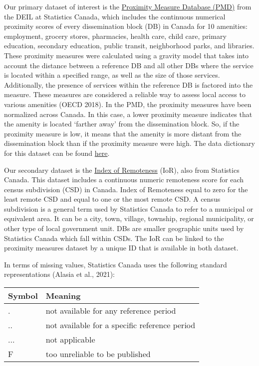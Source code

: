 \documentclass[11pt, a4paper]{article}
\begin{document}
Our primary dataset of interest is the \href{https://www150.statcan.gc.ca/n1/pub/17-26-0002/2020001/csv/pmd-eng.zip}{Proximity Measure Database (PMD)} from the DEIL at Statistics Canada, which includes the continuous numerical proximity scores of every dissemination block (DB) in Canada for 10 amenities: employment, grocery stores, pharmacies, health care, child care, primary education, secondary education, public transit, neighborhood parks, and libraries. These proximity measures were calculated using a gravity model that takes into account the distance between a reference DB and all other DBs where the service is located within a specified range, as well as the size of those services. Additionally, the presence of services within the reference DB is factored into the measure. These measures are considered a reliable way to assess local access to various amenities (OECD 2018). In the PMD, the proximity measures have been normalized across Canada. In this case, a lower proximity measure indicates that the amenity is located `farther away' from the dissemination block. So, if the proximity measure is low, it means that the amenity is more distant from the dissemination block than if the proximity measure were high. The data dictionary for this dataset can be found \href{https://www150.statcan.gc.ca/n1/pub/71-607-x/71-607-x2020011-eng.htm}{here}.
\par
Our secondary dataset is the \href{https://www150.statcan.gc.ca/n1/pub/17-26-0001/172600012020001-eng.htm}{Index of Remoteness} (IoR), also from Statistics Canada. This dataset includes a continuous numeric remoteness score for each census subdivision (CSD) in Canada. Index of Remoteness equal to zero for the least remote CSD and equal to one or the most remote CSD. A census subdivision is a general term used by Statistics Canada to refer to a municipal or equivalent area. It can be a city, town, village, township, regional municipality, or other type of local government unit. DBs are smaller geographic units used by Statistics Canada which fall within CSDs. The IoR can be linked to the proximity measures dataset by a unique ID that is available in both dataset. 
\par 
In terms of missing values, Statistics Canada uses the following standard representations (Alasia et al., 2021): 



\begin{table}[H]
\centering
\begin{tabular}{|l|l|} 
\hline
\textbf{Symbol} & \textbf{Meaning} \\
\hline
. & not available for any reference period \\ 
\hline 
.. & not available for a specific reference period \\ 
\hline 
... & not applicable \\ 
\hline 
F & too unreliable to be published \\ 
\hline 
\end{tabular}
\end{table}
\end{document}
